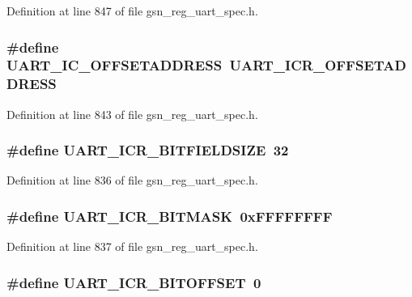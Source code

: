 Definition at line 847 of file gsn\_\-reg\_\-uart\_\-spec.h.

\hypertarget{a00575_a116f76b1f9185f17a77aec2d8a0ed0c1}{
\subsubsection[{UART\_\-IC\_\-OFFSETADDRESS}]{\setlength{\rightskip}{0pt plus 5cm}\#define UART\_\-IC\_\-OFFSETADDRESS~UART\_\-ICR\_\-OFFSETADDRESS}}
\label{a00575_a116f76b1f9185f17a77aec2d8a0ed0c1}


Definition at line 843 of file gsn\_\-reg\_\-uart\_\-spec.h.

\hypertarget{a00575_a92a01cf0b74b4ae786ab3eb7f46cbbe0}{
\subsubsection[{UART\_\-ICR\_\-BITFIELDSIZE}]{\setlength{\rightskip}{0pt plus 5cm}\#define UART\_\-ICR\_\-BITFIELDSIZE~32}}
\label{a00575_a92a01cf0b74b4ae786ab3eb7f46cbbe0}


Definition at line 836 of file gsn\_\-reg\_\-uart\_\-spec.h.

\hypertarget{a00575_a822d618fad4a8a146fd8113f827b5d09}{
\subsubsection[{UART\_\-ICR\_\-BITMASK}]{\setlength{\rightskip}{0pt plus 5cm}\#define UART\_\-ICR\_\-BITMASK~0xFFFFFFFF}}
\label{a00575_a822d618fad4a8a146fd8113f827b5d09}


Definition at line 837 of file gsn\_\-reg\_\-uart\_\-spec.h.

\hypertarget{a00575_a679499a245ea56ebad986aa9b3980631}{
\subsubsection[{UART\_\-ICR\_\-BITOFFSET}]{\setlength{\rightskip}{0pt plus 5cm}\#define UART\_\-ICR\_\-BITOFFSET~0}}
\label{a00575_a679499a245ea56ebad986aa9b3980631}


